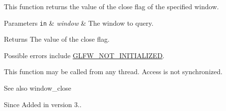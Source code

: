 This function returns the value of the close flag of the specified window.


\begin{DoxyParams}[1]{Parameters}
\mbox{\tt in}  & {\em window} & The window to query. \\
\hline
\end{DoxyParams}
\begin{DoxyReturn}{Returns}
The value of the close flag.
\end{DoxyReturn}
Possible errors include \hyperlink{group__errors_ga2374ee02c177f12e1fa76ff3ed15e14a}{G\+L\+F\+W\+\_\+\+N\+O\+T\+\_\+\+I\+N\+I\+T\+I\+A\+L\+I\+Z\+ED}.

This function may be called from any thread. Access is not synchronized.

\begin{DoxySeeAlso}{See also}
window\+\_\+close
\end{DoxySeeAlso}
\begin{DoxySince}{Since}
Added in version 3.. 
\end{DoxySince}
